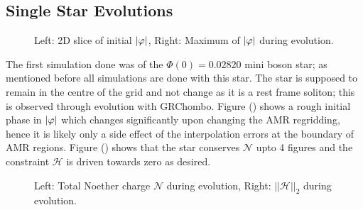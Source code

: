 \subsection{Single Star Evolutions}
  \begin{figure}[h!]
  \caption{Left: 2D slice of initial $|\varphi|$, Right: Maximum of $|\varphi|$ during evolution.}
  \centering
  \hfill
\end{figure}
The first simulation done was of the $\Phi(0)=0.02820$ mini boson star; as mentioned before all simulations are done with this star. The star is supposed to remain in the centre of the grid and not change as it is a rest frame soliton; this is observed through evolution with GRChombo. Figure () shows a rough initial phase in $|\varphi|$ which changes significantly upon changing the AMR regridding, hence it is likely only a side effect of the interpolation errors at the boundary of AMR regions. Figure () shows that the star conserves $\mathcal{N}$ upto 4 figures and the constraint $\mathcal{H}$ is driven towards zero as desired.

  \begin{figure}[h!]
  \caption{Left: Total Noether charge $\mathcal{N}$ during evolution, Right: $|| \mathcal{H} ||_2$ during evolution.}
  \centering
  \hfill
\end{figure}

